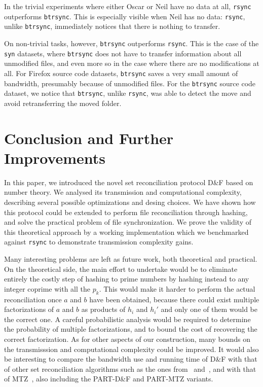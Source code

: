 \documentclass[twoside,envcountsame,runningheads]{llncs}
\newcommand{\df}{D\&F\xspace}
\newcommand{\btrsync}{\texttt{btrsync}\xspace}
\newcommand{\rsync}{\texttt{rsync}\xspace}
\begin{document}
In the trivial experiments where either Oscar or Neil have no data at all, \rsync outperforms \btrsync. This is especially visible when Neil has no data: \rsync, unlike \btrsync, immediately notices that there is nothing to transfer.

On non-trivial tasks, however, \btrsync outperforms \rsync. This is the case of the {\tt syn} datasets, where \btrsync does not have to transfer
information about all unmodified files, and even more so in the case where there are no modifications at all. For Firefox source code datasets, \btrsync saves a very small amount of bandwidth, presumably because of unmodified files. For the \btrsync source code dataset, we notice that \btrsync, unlike \rsync, was able to detect the move and avoid retransferring the moved folder.


\section{Conclusion and Further Improvements}

In this paper, we introduced the novel set reconciliation protocol \df based on number theory. We analysed its transmission and computational complexity, describing several possible optimizations and desing choices. We have shown how this protocol could be extended to perform file reconciliation through hashing, and solve the practical problem of file synchronization. We prove the validity of this theoretical approach by a working implementation which we benchmarked against \rsync to demonstrate transmission complexity gains.

Many interesting problems are left as future work, both theoretical and practical. On the theoretical side, the main effort to undertake would be to eliminate entirely the costly step of hashing to prime numbers by hashing instead to any integer coprime with all the $p_k$. This would make it harder to perform the actual reconciliation once $a$ and $b$ have been obtained, because there could exist multiple factorizations of $a$ and $b$ as products of $h_i$ and $h_i'$ and only one of them would be the correct one. A careful probabilistic analysis would be required to determine the probability of multiple factorizations, and to bound the cost of recovering the correct factorization.
As for other aspects of our construction, many bounds on the transmisssion and computational complexity could be improved.
It would also be interesting to compare the bandwidth use and running time of
\df with that of other set reconciliation algorithms such as the ones
from~\cite{Whats} and~\cite{byers}, and with that of MTZ~\cite{Whats}, also
including the PART-\df and PART-MTZ variants.
\end{document}
